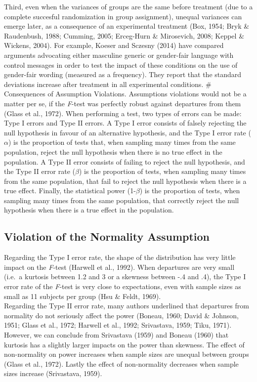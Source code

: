 \documentclass[man,floatsintext]{apa6}
\begin{document}
Third, even when the variances of groups are the same before treatment (due to a complete succesful randomization in group assignment), unequal variances can emerge later, as a consequence of an experimental treatment (Box, 1954; Bryk \& Raudenbush, 1988; Cumming, 2005; Erceg-Hurn \& Mirosevich, 2008; Keppel \& Wickens, 2004). For example, Koeser and Sczesny (2014) have compared arguments advocating either masculine generic or gender-fair language with control messages in order to test the impact of these conditions on the use of gender-fair wording (measured as a frequency). They report that the standard deviations increase after treatment in all experimental conditions.
\# Consequences of Assumption Violations.
Assumptions violations would not be a matter per se, if the \emph{F}-test was perfectly robust against departures from them (Glass et al., 1972). When performing a test, two types of errors can be made: Type I errors and Type II errors. A Type I error consists of falsely rejecting the null hypothesis in favour of an alternative hypothesis, and the Type I error rate (\(\alpha\)) is the proportion of tests that, when sampling many times from the same population, reject the null hypothesis when there is no true effect in the population. A Type II error consists of failing to reject the null hypothesis, and the Type II error rate (\(\beta\)) is the proportion of tests, when sampling many times from the same population, that fail to reject the null hypothesis when there is a true effect. Finally, the statistical power (1-\(\beta\)) is the proportion of tests, when sampling many times from the same population, that correctly reject the null hypothesis when there is a true effect in the population.

\hypertarget{violation-of-the-normality-assumption}{%
\subsection{Violation of the Normality Assumption}\label{violation-of-the-normality-assumption}}

Regarding the Type I error rate, the shape of the distribution has very little impact on the \emph{F}-test (Harwell et al., 1992). When departures are very small (i.e.~a kurtosis between 1.2 and 3 or a skewness between -.4 and .4), the Type I error rate of the \emph{F}-test is very close to expectations, even with sample sizes as small as 11 subjects per group (Hsu \& Feldt, 1969).\\
Regarding the Type II error rate, many authors underlined that departures from normality do not seriously affect the power (Boneau, 1960; David \& Johnson, 1951; Glass et al., 1972; Harwell et al., 1992; Srivastava, 1959; Tiku, 1971). However, we can conclude from Srivastava (1959) and Boneau (1960) that kurtosis has a slightly larger impacts on the power than skewness. The effect of non-normality on power increases when sample sizes are unequal between groups (Glass et al., 1972). Lastly the effect of non-normality decreases when sample sizes increase (Srivastava, 1959).
\end{document}
